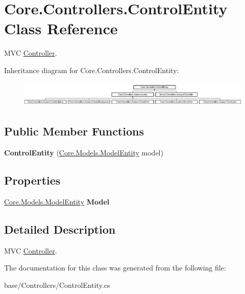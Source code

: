 \hypertarget{classCore_1_1Controllers_1_1ControlEntity}{\section{Core.\-Controllers.\-Control\-Entity Class Reference}
\label{classCore_1_1Controllers_1_1ControlEntity}
}


M\-V\-C \hyperlink{classCore_1_1Controllers_1_1Controller}{Controller}.  


Inheritance diagram for Core.\-Controllers.\-Control\-Entity\-:\begin{figure}[H]
\begin{center}
\leavevmode
\includegraphics[height=1.235294cm]{classCore_1_1Controllers_1_1ControlEntity}
\end{center}
\end{figure}
\subsection*{Public Member Functions}
\begin{DoxyCompactItemize}
\item 
\hypertarget{classCore_1_1Controllers_1_1ControlEntity_ae658365fdb72c178ad05c27d258fcca2}{{\bfseries Control\-Entity} (\hyperlink{classCore_1_1Models_1_1ModelEntity}{Core.\-Models.\-Model\-Entity} model)}\label{classCore_1_1Controllers_1_1ControlEntity_ae658365fdb72c178ad05c27d258fcca2}

\end{DoxyCompactItemize}
\subsection*{Properties}
\begin{DoxyCompactItemize}
\item 
\hypertarget{classCore_1_1Controllers_1_1ControlEntity_ad5b9626748577b6af9b63c5d83e7739a}{\hyperlink{classCore_1_1Models_1_1ModelEntity}{Core.\-Models.\-Model\-Entity} {\bfseries Model}}\label{classCore_1_1Controllers_1_1ControlEntity_ad5b9626748577b6af9b63c5d83e7739a}

\end{DoxyCompactItemize}


\subsection{Detailed Description}
M\-V\-C \hyperlink{classCore_1_1Controllers_1_1Controller}{Controller}. 



The documentation for this class was generated from the following file\-:\begin{DoxyCompactItemize}
\item 
base/\-Controllers/Control\-Entity.\-cs\end{DoxyCompactItemize}
